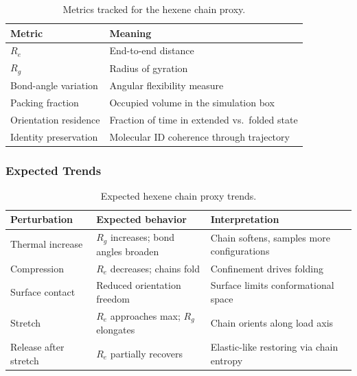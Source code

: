 \documentclass[12pt]{article}
\begin{document}
\begin{table}[H]
\centering
\caption{Metrics tracked for the hexene chain proxy.}
\label{tab:hexene_metrics}
\begin{tabular}{ll}
\toprule
\textbf{Metric} & \textbf{Meaning} \\
\midrule
$R_e$                        & End-to-end distance \\
$R_g$                        & Radius of gyration \\
Bond-angle variation         & Angular flexibility measure \\
Packing fraction             & Occupied volume in the simulation box \\
Orientation residence        & Fraction of time in extended vs.\ folded state \\
Identity preservation        & Molecular ID coherence through trajectory \\
\bottomrule
\end{tabular}
\end{table}

\subsubsection*{Expected Trends}

\begin{table}[H]
\centering
\caption{Expected hexene chain proxy trends.}
\label{tab:hexene_trends}
\begin{tabular}{p{}p{}p{}}
\toprule
\textbf{Perturbation} & \textbf{Expected behavior} & \textbf{Interpretation} \\
\midrule
Thermal increase      & $R_g$ increases; bond angles broaden    & Chain softens, samples more configurations \\
Compression           & $R_e$ decreases; chains fold            & Confinement drives folding \\
Surface contact       & Reduced orientation freedom             & Surface limits conformational space \\
Stretch               & $R_e$ approaches max; $R_g$ elongates   & Chain orients along load axis \\
Release after stretch & $R_e$ partially recovers                & Elastic-like restoring via chain entropy \\
\bottomrule
\end{tabular}
\end{table}
\end{document}
